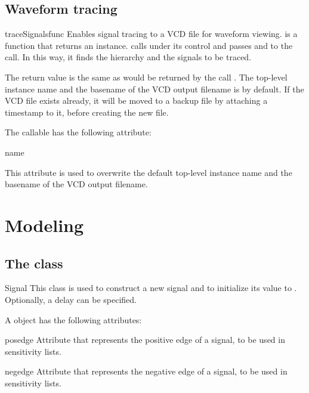 \subsection{Waveform tracing\label{ref-trace}}


\begin{funcdesc}{traceSignals}{func  }
Enables signal tracing to a VCD file for waveform viewing.
 is a function that returns an instance.
 calls  under its control
and passes  and  to the call. In this way, it
finds the hierarchy and the signals to be traced.

The return value is the same as would be returned by the call
.  The top-level instance name and the
basename of the VCD output filename is  by
default. If the VCD file exists already, it will be moved to a backup
file by attaching a timestamp to it, before creating the new file.
\end{funcdesc}

The  callable has the following attribute:

\begin{memberdesc}[traceSignals]{name}

This attribute is used to overwrite the default top-level instance
name and the basename of the VCD output filename.
\end{memberdesc}

\section{Modeling \label{ref-model}}

\subsection{The  class \label{ref-sig}}

\begin{classdesc}{Signal}{ }
This class is used to construct a new signal and to initialize its
value to . Optionally, a delay can be specified.
\end{classdesc}

A  object has the following attributes:

\begin{memberdesc}[Signal]{posedge}
Attribute that represents the positive edge of a signal, to be
used in sensitivity lists.
\end{memberdesc}
\begin{memberdesc}[Signal]{negedge}
Attribute that represents the negative edge of a signal, to be
used in sensitivity lists.
\end{memberdesc}

